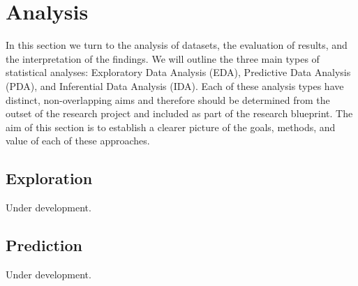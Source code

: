 \documentclass[
  letterpaper,
  DIV=11,
  numbers=noendperiod]{scrreport}
\theoremstyle{definition}
\theoremstyle{remark}
\begin{document}
\part{Analysis}

In this section we turn to the analysis of datasets, the evaluation of
results, and the interpretation of the findings. We will outline the
three main types of statistical analyses: Exploratory Data Analysis
(EDA), Predictive Data Analysis (PDA), and Inferential Data Analysis
(IDA). Each of these analysis types have distinct, non-overlapping aims
and therefore should be determined from the outset of the research
project and included as part of the research blueprint. The aim of this
section is to establish a clearer picture of the goals, methods, and
value of each of these approaches.

\hypertarget{sec-exploration}{%
\chapter{Exploration}\label{sec-exploration}}

\begin{tcolorbox}[enhanced jigsaw, breakable, arc=.35mm, opacityback=0, bottomrule=.15mm, colback=white, opacitybacktitle=0.6, colframe=quarto-callout-caution-color-frame, toptitle=1mm, colbacktitle=quarto-callout-caution-color!10!white, left=2mm, leftrule=.75mm, toprule=.15mm, title=\textcolor{quarto-callout-caution-color}{\faFire}\hspace{0.5em}{Caution}, bottomtitle=1mm, coltitle=black, titlerule=0mm, rightrule=.15mm]

Under development.

\end{tcolorbox}

\hypertarget{sec-prediction}{%
\chapter{Prediction}\label{sec-prediction}}

\begin{tcolorbox}[enhanced jigsaw, breakable, arc=.35mm, opacityback=0, bottomrule=.15mm, colback=white, opacitybacktitle=0.6, colframe=quarto-callout-caution-color-frame, toptitle=1mm, colbacktitle=quarto-callout-caution-color!10!white, left=2mm, leftrule=.75mm, toprule=.15mm, title=\textcolor{quarto-callout-caution-color}{\faFire}\hspace{0.5em}{Caution}, bottomtitle=1mm, coltitle=black, titlerule=0mm, rightrule=.15mm]

Under development.

\end{tcolorbox}
\end{document}
